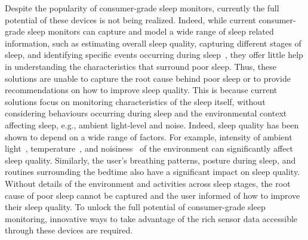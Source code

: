 
Despite the popularity of consumer-grade sleep monitors, currently the full potential of these devices is not being realized. Indeed, while
current consumer-grade sleep monitors can capture and model a wide range of sleep related information, such as estimating overall sleep
quality, capturing different stages of sleep, and identifying specific events occurring during
sleep~\cite{kay2012lullaby,zhang2013real,sleepmonitor}, they offer little help in understanding the characteristics that surround poor
sleep. Thus, these solutions are unable to capture the root cause behind poor sleep or to provide recommendations on how to improve sleep
quality. This is because current solutions focus on monitoring characteristics of the sleep itself, without considering behaviours
occurring during sleep and the environmental context affecting sleep, e.g., ambient light-level and noise. Indeed, sleep quality has been
shown to depend on a wide range of factors. For example, intensity of ambient light~\cite{hood04determinants},
temperature~\cite{urponen88self}, and noisiness~\cite{muzet2007environmental} of the environment can significantly affect sleep quality.
Similarly, the user's breathing patterns, posture during sleep, and routines surrounding the bedtime also have a significant impact on
sleep quality. Without details of the environment and activities across sleep stages, the root cause of poor sleep cannot be captured and
the user informed of how to improve their sleep quality. To unlock the full potential of consumer-grade sleep monitoring, innovative ways
to take advantage of the rich sensor data accessible through these devices are required.

